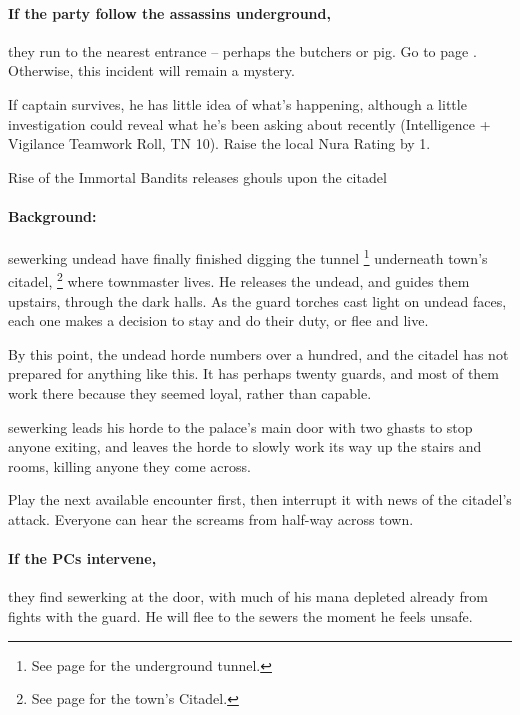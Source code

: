 \begin{multicols}{2}
\begin{tcolorbox}[tabularx={cX},top=10pt,bottom=10pt]
\end{tcolorbox}

\sewerthief


\paragraph{If the party follow the assassins underground,}
they run to the nearest entrance -- perhaps the butchers or \gls{pig}.
Go to page \pageref{sewers}.
Otherwise, this incident will remain a mystery.

If \gls{captain} survives, he has little idea of what's happening, although a little investigation could reveal what he's been asking about recently (Intelligence + Vigilance Teamwork Roll, TN 10).
Raise the local Nura Rating by 1.

{\N\N\squash Rise of the Immortal Bandits}%
{ releases ghouls upon the citadel}%

\paragraph{Background:}
\Gls{sewerking} undead have finally finished digging the tunnel
\footnote{See page \pageref{citadelTunnel} for the underground tunnel.}
underneath \gls{town}'s citadel,
\footnote{See page \pageref{citadel} for the town's Citadel.}
where \gls{townmaster} lives.
He releases the undead, and guides them upstairs, through the dark halls.
As the \gls{guard} torches cast light on undead faces, each one makes a decision to stay and do their duty, or flee and live.

By this point, the undead horde numbers over a hundred, and the citadel has not prepared for anything like this.
It has perhaps twenty guards, and most of them work there because they seemed loyal, rather than capable.

\Gls{sewerking} leads his horde to the palace's main door with two ghasts to stop anyone exiting, and leaves the horde to slowly work its way up the stairs and rooms, killing anyone they come across.

Play the next available encounter first, then interrupt it with news of the citadel's attack.
Everyone can hear the screams from half-way across \gls{town}.

\paragraph{If the PCs intervene,}
they find \gls{sewerking} at the door, with much of his mana depleted already from fights with the guard.
He will flee to the sewers the moment he feels unsafe.


\end{multicols}

